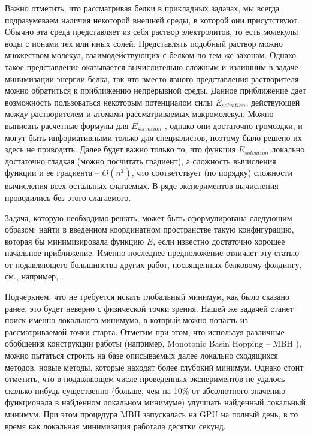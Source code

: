   Важно отметить, что рассматривая белки в прикладных задачах, мы всегда подразумеваем наличия некоторой внешней среды, в которой они присутствуют.
  Обычно эта среда представляет из себя раствор электролитов, то есть молекулы воды с ионами тех или иных солей.
  Представлять подобный раствор можно множеством молекул, взаимодействующих с белком по тем же законам.
  Однако такое представление оказывается вычислительно сложным и излишним в задаче минимизации энергии белка, так что вместо явного представления растворителя можно обратиться к приближению непрерывной среды.
  Данное приближение дает возможность пользоваться некоторым потенциалом силы $E_{solvation}$, действующей между растворителем и атомами рассматриваемых макромолекул.
  Можно выписать расчетные формулы для $E_{solvation}$ \cite{still1990semianalytical}, однако они достаточно громоздки, и могут быть информативными только для специалистов, поэтому было решено их здесь не приводить.
  Далее будет важно только то, что функция $E_{solvation}$ локально достаточно гладкая (можно посчитать градиент), а сложность вычисления функции и ее градиента -- ${O}\left( n^2 \right)$, что соответствует (по порядку) сложности вычисления всех остальных слагаемых.
  В ряде экспериментов вычисления проводились без этого слагаемого.

  Задача, которую необходимо решать, может быть сформулирована следующим образом: найти в введенном координатном пространстве такую конфигурацию, которая бы минимизировала функцию $E$, если известно достаточно хорошее начальное приближение.
  Именно последнее предположение отличает эту статью от подавляющего большинства других работ, посвященных белковому фолдингу, см., например, \cite{zhmur}. 

  Подчеркнем, что не требуется искать глобальный минимум, как было сказано ранее, это будет неверно с физической точки зрения.
  Нашей же задачей станет поиск именно локального минимума, в который можно попасть из рассматриваемой точки старта.
  Отметим при этом, что используя различные обобщения конструкции работы \cite{wales1997global} (например, Monotonic Basin Hopping -- MBH \cite{posypkin2010}), можно пытаться строить на базе описываемых далее локально сходящихся методов, новые методы, которые находят более глубокий минимум.
  Однако стоит отметить, что в подавляющем числе проведенных экспериментов не удалось сколько-нибудь существенно (больше, чем на 10\% от абсолютного значению функционала в найденном локальном минимуме) улучшать найденный локальный минимум.
  При этом процедура MBH запускалась на GPU на полный день, в то время как локальная минимизация работала десятки секунд.

